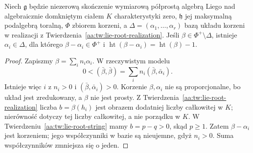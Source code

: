 \begin{lemat}
\label{aa:lem:lie-root-descent}
Niech $\mathfrak g$ będzie niezerową skończenie wymiarową półprostą algebrą Liego nad algebraicznie domkniętym ciałem $K$ charakterystyki zero, $\mathfrak h$ jej maksymalną podalgebrą toralną, $\Phi$ zbiorem korzeni, a $\Delta=(\alpha_1,\ldots,\alpha_r)$ bazą układu korzeni w realizacji z Twierdzenia~\ref{aa:tw:lie-root-realization}. Jeśli $\beta\in\Phi^+\setminus\Delta$, istnieje $\alpha_i\in\Delta$, dla którego $\beta-\alpha_i\in\Phi^+$ i $\operatorname{ht}(\beta-\alpha_i)=\operatorname{ht}(\beta)-1$.
\end{lemat}
\begin{proof}
Zapiszmy $\beta=\sum_i n_i\alpha_i$. W rzeczywistym modelu
\[
 0<(\bar\beta,\bar\beta)=\sum_i n_i(\bar\beta,\bar\alpha_i).
\]
Istnieje więc $i$ z $n_i>0$ i $(\bar\beta,\bar\alpha_i)>0$. Korzenie $\beta,\alpha_i$ nie są proporcjonalne, bo układ jest zredukowany, a $\beta$ nie jest prosty. Z Twierdzenia~\ref{aa:tw:lie-root-realization} liczba $b=\beta(h_i)$ jest obrazem dodatniej liczby całkowitej w $K$; nierówność dotyczy tej liczby całkowitej, a nie porządku w $K$. W Twierdzeniu~\ref{aa:tw:lie-root-string} mamy $b=p-q>0$, skąd $p\ge1$. Zatem $\beta-\alpha_i$ jest korzeniem; jego współczynniki w bazie są nieujemne, gdyż $n_i>0$. Suma współczynników zmniejsza się o jeden.
\end{proof}

